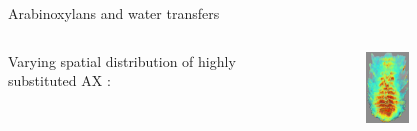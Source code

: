 \documentclass[10pt]{beamer}
\begin{document}
\begin{frame}{Arabinoxylans and water transfers}
  \begin{columns}[totalwidth=\textwidth]
    \begin{column}[t]{0.6\linewidth}
        {Varying spatial distribution of highly substituted AX \cite{Fanuel18}:}
    \end{column}
    \begin{column}[c]{0.4\linewidth}
      \hfill
      \begin{figure}[ht]
        \centering
        \begin{subfigure}[t]{0.45\textwidth}
          \centering
          \includegraphics[width=0.65\textwidth]{fig/3DAX}
          \label{subfig:3Darabinoxylan}
        \end{subfigure}%
        \begin{subfigure}[t]{0.45\textwidth}
          \centering

\end{subfigure}
\end{figure}
\end{column}
\end{columns}
\end{frame}
\end{document}
